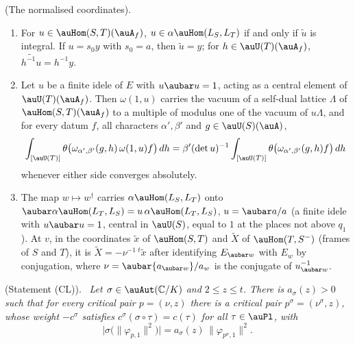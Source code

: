 \documentclass[10pt]{amsart}
\theoremstyle{definition}
\theoremstyle{remark}
\newcommand{\C}{\mathbb C}
\newenvironment{quotedthm}[2]{\par\medskip\noindent\begingroup
  \textbf{#1}#2.\ \itshape\ignorespaces}{\endgroup\par\medskip}
\begin{document}
\begin{quotedthm}{\cite[Lemma~6.32]{P53}}{ (The normalised coordinates)}
\begin{enumerate}
matrices and depends only on $T$ modulo $\pcm$.
\item[(d)] For $u\in\auHom(S,T)(\auA_f)$, $u\in\alpha\auHom(L_S,L_T)$ if and only if $\tilde u$ is
integral. If $u=s_0y$ with $s_0=a$, then $\tilde u=y$; for $h\in\auU(T)(\auA_f)$,
$\widetilde{h^{-1}u}=h^{-1}y$.
\item[(e)] Let $u$ be a finite idele of $E$ with $u\aubar u=1$, acting as a central element of
$\auU(T)(\auA_f)$. Then $\omega(1,u)$ carries the vacuum of a self-dual lattice $\Lambda$ of
$\auHom(S,T)(\auA_f)$ to a multiple of modulus one of the vacuum of $u\Lambda$, and for every datum $f$,
all characters $\alpha',\beta'$ and $g\in\auU(S)(\auA)$,
\[
\int_{[\auU(T)]}\theta\bigl(\omega_{\alpha',\beta'}(g,h)\,\omega(1,u)f\bigr)\,dh=\beta'(\det u)^{-1}
\int_{[\auU(T)]}\theta\bigl(\omega_{\alpha',\beta'}(g,h)f\bigr)\,dh
\]
whenever either side converges absolutely.
\item[(f)] The map $w\mapsto w^\dagger$ carries $\alpha\auHom(L_S,L_T)$ onto $\aubar\alpha\auHom(L_T,L_S)=
u\,\alpha\auHom(L_T,L_S)$, $u=\aubar a/a$ (a finite idele with $u\aubar u=1$, central in $\auU(S)$,
equal to $1$ at the places not above $q_1$). At $v$, in the coordinates $\tilde x$ of $\auHom(S,T)$ and
$\tilde X$ of $\auHom(T,S^-)$ (frames of $S$ and $T$), it is $\tilde X=-\nu^{-1}\,{}^t\tilde x$ after
identifying $E_{\aubar w}$ with $E_w$ by conjugation, where $\nu=\aubar{a_{\aubar w}}/a_w$ is the
conjugate of $u_{\aubar w}^{-1}$.
\end{enumerate}
\end{quotedthm}

\begin{quotedthm}{\cite[Theorem~9.1]{P53}}{ (Statement (CL))}
Let $\sigma\in\auAut(\C/K)$ and $2\le z\le t$. There is $a_\sigma(z)>0$ such that for every critical
pair $p=(\nu,z)$ there is a critical pair $p^\sigma=(\nu^{\sigma},z)$, whose weight $-c^\sigma$ satisfies
$c^\sigma(\sigma\circ\tau)=c(\tau)$ for all $\tau\in\auPl$, with
\[
\bigl|\sigma\bigl(\|\varphi_{p,1}\|^2\bigr)\bigr|=a_\sigma(z)\,\|\varphi_{p^\sigma,1}\|^2 .
\]
\end{quotedthm}
\end{document}
